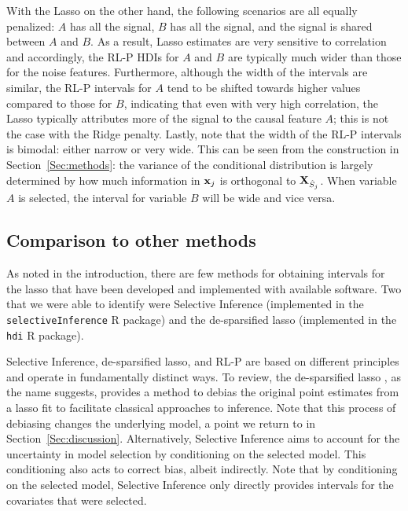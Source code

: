 With the Lasso on the other hand, the following scenarios are all equally penalized: $A$ has all the signal, $B$ has all the signal, and the signal is shared between $A$ and $B$. As a result, Lasso estimates are very sensitive to correlation and accordingly, the RL-P HDIs for $A$ and $B$ are typically much wider than those for the noise features. Furthermore, although the width of the intervals are similar, the RL-P intervals for $A$ tend to be shifted towards higher values compared to those for $B$, indicating that even with very high correlation, the Lasso typically attributes more of the signal to the causal feature $A$; this is not the case with the Ridge penalty. Lastly, note that the width of the RL-P intervals is bimodal: either narrow or very wide. This can be seen from the construction in Section~\ref{Sec:methods}: the variance of the conditional distribution is largely determined by how much information in $\mathbf{x}_j$ is orthogonal to $\mathbf{X}_{\hat{S}_j}$. When variable $A$ is selected, the interval for variable $B$ will be wide and vice versa.

\subsection{Comparison to other methods} \label{Sec:Comparison}

As noted in the introduction, there are few methods for obtaining intervals for the lasso that have been developed and implemented with available software. Two that we were able to identify were Selective Inference (implemented in the \texttt{selectiveInference} R package) and the de-sparsified lasso (implemented in the \texttt{hdi} R package).

Selective Inference, de-sparsified lasso, and RL-P are based on different principles and operate in fundamentally distinct ways. To review, the de-sparsified lasso \citep{ZhangZhang2014}, as the name suggests, provides a method to debias the original point estimates from a lasso fit to facilitate classical approaches to inference. Note that this process of debiasing changes the underlying model, a point we return to in Section~\ref{Sec:discussion}. Alternatively, Selective Inference \citep{Lee2016,Tibshirani2016} aims to account for the uncertainty in model selection by conditioning on the selected model. This conditioning also acts to correct bias, albeit indirectly. Note that by conditioning on the selected model, Selective Inference only directly provides intervals for the covariates that were selected.

